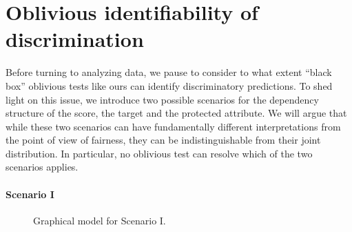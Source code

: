 \section{Oblivious identifiability of discrimination}
\label{sec:oblivious}

Before turning to analyzing data, we pause to consider to what extent
``black box'' oblivious tests like ours can identify discriminatory
predictions. To shed light on this issue, we introduce two possible scenarios
for the dependency structure of the score, the target and the protected
attribute. We will argue that while these two scenarios can have fundamentally
different interpretations from the point of view of fairness, they can be
indistinguishable from their joint distribution. In particular, no oblivious
test can resolve which of the two scenarios applies.

\paragraph{Scenario I}

\begin{figure}
\begin{center}
\end{center}
\caption{Graphical model for Scenario I.}
\label{fig:scenario1}
\end{figure}

